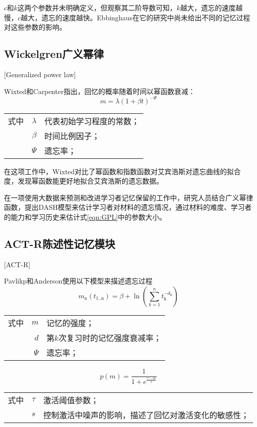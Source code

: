 $c$和$k$这两个参数并未明确定义，但观察其二阶导数可知，$k$越大，遗忘的速度越慢，$c$越大，遗忘的速度越快。Ebbinghaus在它的研究中尚未给出不同的记忆过程对这些参数的影响。

\subsection{Wickelgren广义幂律}[Generalized power law]

Wixted和Carpenter\cite{wixtedWickelgrenPowerLaw2007}指出，回忆的概率随着时间以幂函数衰减：
\begin{equation}
\label{eqn:GPL}
m=\lambda(1+\beta t)^{-\Psi}
\end{equation}
\begin{tabularx}{\textwidth}{@{}l@{\quad}r@{———}X@{}}
    式中& $\lambda$ &代表初始学习程度的常数；\\
    &  $\beta$ &时间比例因子；\\
    &  $\Psi$ &遗忘率；
\end{tabularx}\vspace{3.15bp}

在这项工作中，Wixted对比了幂函数和指数函数对艾宾浩斯对遗忘曲线的拟合度，发现幂函数能更好地拟合艾宾浩斯的遗忘数据。

在一项使用大数据来预测和改进学习者记忆保留的工作中，研究人员结合广义幂律函数，提出DASH模型来估计学习者对材料的遗忘情况，通过材料的难度、学习者的能力和学习历史来估计式\ref{eqn:GPL}中的参数大小\cite{jonesPredictingImprovingMemory2016}。

\subsection{ACT-R陈述性记忆模块}[ACT-R]

Pavlikp和Anderson\cite{pavlikUsingModelCompute2008}使用以下模型来描述遗忘过程
\begin{equation}
m_\mathrm{n}(t_\mathrm{1..n}) = \beta + \ln(\sum\limits_{k=1}^n t_\mathrm{k}^{-d_\mathrm{k}})
\end{equation}
\begin{tabularx}{\textwidth}{@{}l@{\quad}r@{———}X@{}}
    式中& $m$ &记忆的强度；\\
    & $d$ &第$k$次复习时的记忆强度衰减率；\\
    & $\Psi$ &遗忘率；
\end{tabularx}\vspace{3.15bp}
\begin{equation}
p(m) = \frac{1}{1+e^{\frac{\tau-m}{s}}}
\end{equation}
\begin{tabularx}{\textwidth}{@{}l@{\quad}r@{———}X@{}}
    式中& $\tau$ &激活阈值参数；\\
    & $s$ &控制激活中噪声的影响，描述了回忆对激活变化的敏感性；
\end{tabularx}\vspace{3.15bp}

